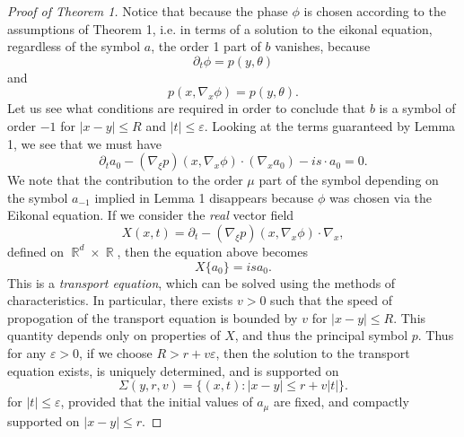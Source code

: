 \documentclass{article}
\theoremstyle{plain}
\theoremstyle{remark}
\theoremstyle{definition}
\DeclareMathOperator{\RR}{\mathbb{R}}
\begin{document}
\begin{proof}[Proof of Theorem 1]

Notice that because the phase $\phi$ is chosen according to the assumptions of Theorem 1, i.e. in terms of a solution to the eikonal equation, regardless of the symbol $a$, the order 1 part of $b$ vanishes, because
%
\[ \partial_t \phi = p(y, \theta) \]
%
and
%
\[ p( x, \nabla_x \phi ) = p(y,\theta). \]
%
Let us see what conditions are required in order to conclude that $b$ is a symbol of order $-1$ for $|x - y| \leq R$ and $|t| \leq \varepsilon$. Looking at the terms guaranteed by Lemma 1, we see that we must have
%
\[ \partial_t a_0 - (\nabla_\xi p)(x, \nabla_x \phi) \cdot (\nabla_x a_0) - i s \cdot a_0 = 0. \]
%
We note that the contribution to the order $\mu$ part of the symbol depending on the symbol $a_{-1}$ implied in Lemma 1 disappears because $\phi$ was chosen via the Eikonal equation. If we consider the \emph{real} vector field
%
\[ X(x,t) = \partial_t - (\nabla_\xi p)(x,\nabla_x \phi) \cdot \nabla_x, \]
%
defined on $\RR^d \times \RR$, then the equation above becomes
%
\[ X \{ a_0 \} = i s a_0. \]
%
This is a \emph{transport equation}, which can be solved using the methods of characteristics. In particular, there exists $v > 0$ such that the speed of propogation of the transport equation is bounded by $v$ for $|x - y| \leq R$. This quantity depends only on properties of $X$, and thus the principal symbol $p$. Thus for any $\varepsilon > 0$, if we choose $R > r + v \varepsilon$, then the solution to the transport equation exists, is uniquely determined, and is supported on
%
\[ \Sigma(y,r,v) = \{ (x,t) : |x - y| \leq r + v |t| \}. \]
%
for $|t| \leq \varepsilon$, provided that the initial values of $a_\mu$ are fixed, and compactly supported on $|x - y| \leq r$.


\end{proof}
\end{document}

